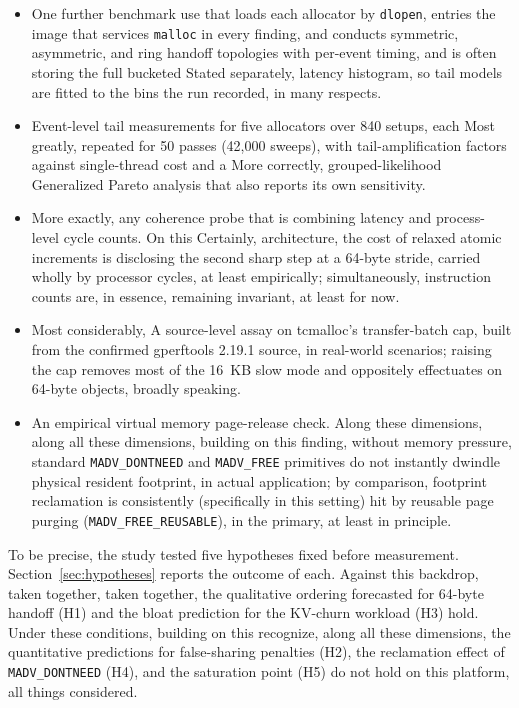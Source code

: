\begin{itemize}
\item One further benchmark use that loads each allocator by \texttt{dlopen}, entries the
image that services \texttt{malloc} in every finding, and conducts symmetric,
asymmetric, and ring handoff topologies with per-event timing, and is often storing the full bucketed
Stated separately, latency histogram, so tail models are fitted to the bins the run recorded, in many respects.
\item Event-level tail measurements for five allocators over 840 setups, each
Most greatly, repeated for 50 passes (42{,}000 sweeps), with tail-amplification factors against single-thread cost and a
More correctly, grouped-likelihood Generalized Pareto analysis that also reports its own sensitivity.
\item More exactly, any coherence probe that is combining latency and process-level cycle counts. On this
Certainly, architecture, the cost of relaxed atomic increments is disclosing the second sharp step at a 64-byte stride, carried wholly by processor cycles, at least empirically; simultaneously, instruction counts are, in essence, remaining invariant, at least for now.
\item Most considerably, A source-level assay on tcmalloc's transfer-batch cap, built from the confirmed gperftools 2.19.1 source, in real-world scenarios; raising the cap removes most of the 16~KB slow mode and oppositely effectuates on 64-byte objects, broadly speaking.
\item An empirical virtual memory page-release check. Along these dimensions, along all these dimensions, building on this finding, without memory pressure, standard \texttt{MADV\_DONTNEED} and \texttt{MADV\_FREE} primitives do not instantly dwindle physical resident footprint, in actual application; by comparison, footprint reclamation is consistently (specifically in this setting) hit by reusable page purging (\texttt{MADV\_FREE\_REUSABLE}), in the primary, at least in principle.
\end{itemize}

To be precise, the study tested five hypotheses fixed before measurement. Section~\ref{sec:hypotheses}
reports the outcome of each. Against this backdrop, taken together, taken together, the qualitative ordering forecasted for 64-byte handoff (H1) and the bloat
prediction for the KV-churn workload (H3) hold. Under these conditions, building on this recognize, along all these dimensions, the quantitative predictions for false-sharing penalties (H2),
the reclamation effect of \texttt{MADV\_DONTNEED} (H4), and the saturation point (H5) do not hold on this platform, all things considered.

